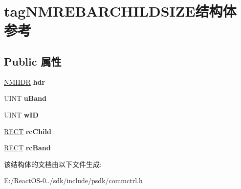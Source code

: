 \hypertarget{structtag_n_m_r_e_b_a_r_c_h_i_l_d_s_i_z_e}{}\section{tag\+N\+M\+R\+E\+B\+A\+R\+C\+H\+I\+L\+D\+S\+I\+Z\+E结构体 参考}
\label{structtag_n_m_r_e_b_a_r_c_h_i_l_d_s_i_z_e}
\subsection*{Public 属性}
\begin{DoxyCompactItemize}
\item 
\mbox{\label{structtag_n_m_r_e_b_a_r_c_h_i_l_d_s_i_z_e_a8653cd488ffe89ea385a8c064be9553f}} 
\hyperlink{structtag_n_m_h_d_r}{N\+M\+H\+DR} {\bfseries hdr}
\item 
\mbox{\label{structtag_n_m_r_e_b_a_r_c_h_i_l_d_s_i_z_e_a3759ad4026e37b6a5c5ebd7cbe95f04b}} 
U\+I\+NT {\bfseries u\+Band}
\item 
\mbox{\label{structtag_n_m_r_e_b_a_r_c_h_i_l_d_s_i_z_e_a0235afa695af411a3b17a3aa3a970d8d}} 
U\+I\+NT {\bfseries w\+ID}
\item 
\mbox{\label{structtag_n_m_r_e_b_a_r_c_h_i_l_d_s_i_z_e_a135572f476e33444119f6beece7432d8}} 
\hyperlink{structtag_r_e_c_t}{R\+E\+CT} {\bfseries rc\+Child}
\item 
\mbox{\label{structtag_n_m_r_e_b_a_r_c_h_i_l_d_s_i_z_e_aa9625053809c3dea743ee773aeaccc83}} 
\hyperlink{structtag_r_e_c_t}{R\+E\+CT} {\bfseries rc\+Band}
\end{DoxyCompactItemize}


该结构体的文档由以下文件生成\+:\begin{DoxyCompactItemize}
\item 
E\+:/\+React\+O\+S-\/0../sdk/include/psdk/commctrl.\+h\end{DoxyCompactItemize}

